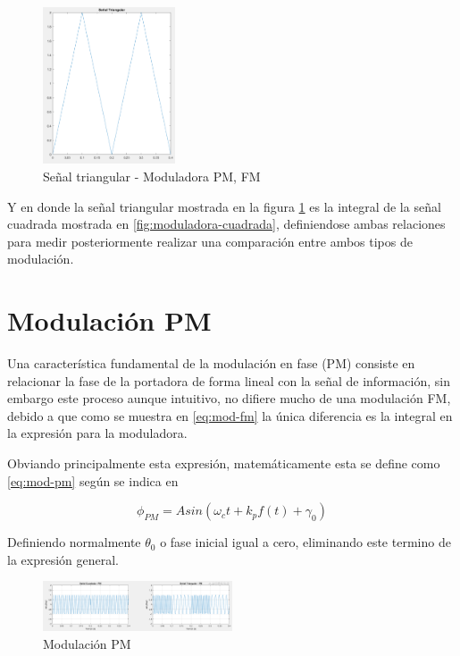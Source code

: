 \documentclass[conference]{IEEEtran}
\begin{document}
	\begin{figure}[h]
		\centering
		\includegraphics[width=0.35\textwidth]{media/moduladora-triangularpng}
		\caption{Señal triangular - Moduladora PM, FM}
		\label{fig:moduladora-triangularpng}
	\end{figure}
	
	Y en donde la señal triangular mostrada en la figura \ref{fig:moduladora-triangularpng} es la integral de la señal cuadrada mostrada en \ref{fig:moduladora-cuadrada}, definiendose ambas relaciones para medir posteriormente realizar una comparación entre ambos tipos de modulación.
	
	\section{ Modulación PM}
	
	Una característica fundamental de la modulación en fase (PM) consiste en relacionar la fase de la portadora de forma lineal con la señal de información, sin embargo este proceso aunque intuitivo, no difiere mucho de una modulación FM, debido a que como se muestra en \ref{eq:mod-fm} la única diferencia es la integral en la expresión para la moduladora.
	
	Obviando principalmente esta expresión, matemáticamente esta se define como \ref{eq:mod-pm} según se indica en \cite{stremler2006}
	
	\begin{equation}
		\phi_{PM} = Asin( \omega_c t + k_p f(t) + \gamma_0 )
		\label{eq:mod-pm}
	\end{equation}
	
	Definiendo normalmente $\theta_0$ o fase inicial igual a cero, eliminando este termino de la expresión general.
	
	\begin{figure}[h]
		\centering
		\includegraphics[width=0.5\textwidth]{media/modulacion-pm}
		\caption{Modulación PM}
		\label{fig:modulacion-pm}
	\end{figure}
	
\end{document}
